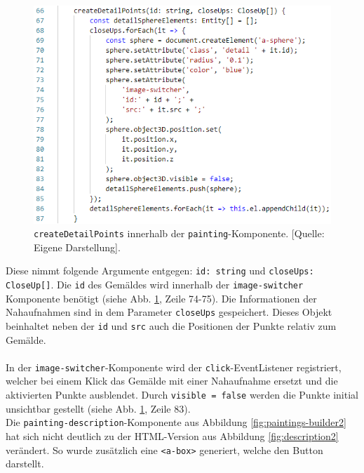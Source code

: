 \documentclass[a4paper,12pt,oneside]{article}
\begin{document}
        \begin{figure}
          \centering
          \includegraphics{img/coding/painting1.png}
          \caption[\texttt{createDetailPoints} innerhalb der \texttt{painting}-Komponente.]{\texttt{createDetailPoints} innerhalb der \texttt{painting}-Komponente. [Quelle: Eigene Darstellung].}
          \label{fig:painting1}
        \end{figure}
        Diese nimmt folgende Argumente entgegen: \texttt{id: string} und
        \texttt{closeUps: CloseUp[]}. Die \texttt{id} des Gemäldes wird
        innerhalb der \texttt{image-switcher} Komponente benötigt
        (siehe Abb. \ref{fig:painting1}, Zeile 74-75). 
        Die Informationen der Nahaufnahmen sind in dem Parameter 
        \texttt{closeUps} gespeichert. Dieses Objekt beinhaltet neben
        der \texttt{id} und \texttt{src} auch die Positionen der Punkte
        relativ zum Gemälde. \\ \\
        In der \texttt{image-switcher}-Komponente
        wird der \texttt{click}-EventListener registriert, welcher bei
        einem Klick das Gemälde mit einer Nahaufnahme ersetzt und die 
        aktivierten Punkte ausblendet. Durch
        \texttt{visible = false} werden die Punkte initial unsichtbar gestellt
        (siehe Abb. \ref{fig:painting1}, Zeile 83). \\
        Die \texttt{painting-description}-Komponente aus Abbildung 
        \ref{fig:paintings-builder2} hat sich nicht deutlich
        zu der HTML-Version aus Abbildung \ref{fig:description2} verändert. 
        So wurde zusätzlich
        eine \texttt{<a-box>} generiert, welche den Button darstellt.
\end{document}
